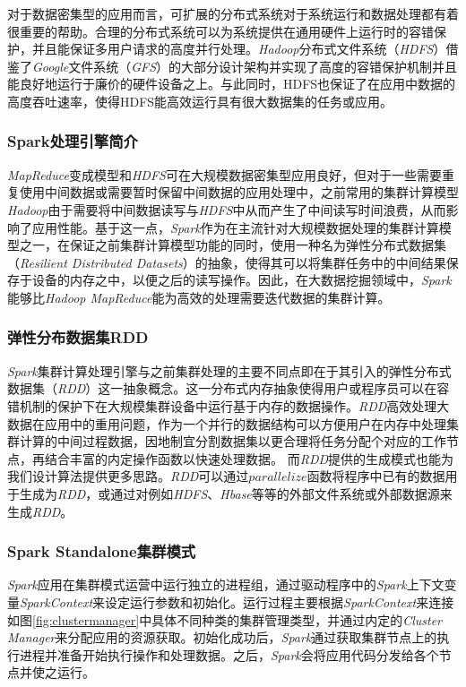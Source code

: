 对于数据密集型的应用而言，可扩展的分布式系统对于系统运行和数据处理都有着很重要的帮助。合理的分布式系统可以为系统提供在通用硬件上运行时的容错保护，并且能保证多用户请求的高度并行处理。\emph{Hadoop}分布式文件系统（\emph{HDFS}）借鉴了\emph{Google}文件系统（\emph{GFS}）的大部分设计架构并实现了高度的容错保护机制并且能良好地运行于廉价的硬件设备之上。与此同时，HDFS也保证了在应用中数据的高度吞吐速率，使得HDFS能高效运行具有很大数据集的任务或应用。

\subsubsection{Spark处理引擎简介}
\label{subsubsec:spark}
\emph{MapReduce}变成模型和\emph{HDFS}可在大规模数据密集型应用良好，但对于一些需要重复使用中间数据或需要暂时保留中间数据的应用处理中，之前常用的集群计算模型\emph{Hadoop}由于需要将中间数据读写与\emph{HDFS}中从而产生了中间读写时间浪费，从而影响了应用性能。基于这一点，\emph{Spark}\cite{zaharia2010spark}作为在主流针对大规模数据处理的集群计算模型之一，在保证之前集群计算模型功能的同时，使用一种名为弹性分布式数据集（\emph{Resilient Distributed Datasets}）的抽象，使得其可以将集群任务中的中间结果保存于设备的内存之中，以便之后的读写操作。因此，在大数据挖掘领域中，\emph{Spark}能够比\emph{Hadoop MapReduce}能为高效的处理需要迭代数据的集群计算。

\subsubsection{弹性分布数据集RDD}
\label{subsubsec:rdd}
\emph{Spark}集群计算处理引擎与之前集群处理的主要不同点即在于其引入的弹性分布式数据集（\emph{RDD}）这一抽象概念。这一分布式内存抽象使得用户或程序员可以在容错机制的保护下在大规模集群设备中运行基于内存的数据操作。\emph{RDD}高效处理大数据在应用中的重用问题，作为一个并行的数据结构可以方便用户在内存中处理集群计算的中间过程数据，因地制宜分割数据集以更合理将任务分配个对应的工作节点，再结合丰富的内定操作函数以快速处理数据。
而\emph{RDD}提供的生成模式也能为我们设计算法提供更多思路。\emph{RDD}可以通过$parallelize$函数将程序中已有的数据用于生成为\emph{RDD}，或通过对例如\emph{HDFS}、\emph{Hbase}等等的外部文件系统或外部数据源来生成\emph{RDD}。

\subsubsection{Spark Standalone集群模式}
\label{subsubsec:standalone}
\emph{Spark}应用在集群模式运营中运行独立的进程组，通过驱动程序中的\emph{Spark}上下文变量\emph{SparkContext}来设定运行参数和初始化。运行过程主要根据\emph{SparkContext}来连接如图\ref{fig:clustermanager}\cite{sparkclustermanager}中具体不同种类的集群管理类型，并通过内定的\emph{Cluster Manager}来分配应用的资源获取。初始化成功后，\emph{Spark}通过获取集群节点上的执行进程并准备开始执行操作和处理数据。之后，\emph{Spark}会将应用代码分发给各个节点并使之运行。

